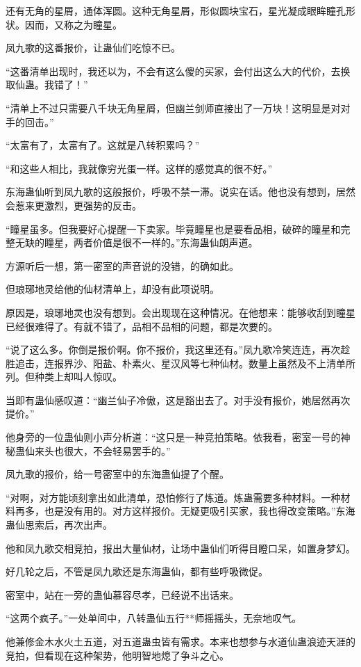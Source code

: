 \begin{this_body}
还有无角的星屑，通体浑圆。这种无角星屑，形似圆块宝石，星光凝成眼眸瞳孔形状。因而，又称之为瞳星。

凤九歌的这番报价，让蛊仙们吃惊不已。

“这番清单出现时，我还以为，不会有这么傻的买家，会付出这么大的代价，去换取仙蛊。我错了！”

“清单上不过只需要八千块无角星屑，但幽兰剑师直接出了一万块！这明显是对对手的回击。”

“太富有了，太富有了。这就是八转积累吗？”

“和这些人相比，我就像穷光蛋一样。这样的感觉真的很不好。”

东海蛊仙听到凤九歌的这般报价，呼吸不禁一滞。说实在话。他也没有想到，居然会惹来更激烈，更强势的反击。

“瞳星虽多。但我要好心提醒一下卖家。毕竟瞳星也是要看品相，破碎的瞳星和完整无缺的瞳星，两者价值是很不一样的。”东海蛊仙朗声道。

方源听后一想，第一密室的声音说的没错，的确如此。

但琅琊地灵给他的仙材清单上，却没有此项说明。

原因是，琅琊地灵也没有想到。会出现现在这种情况。在他想来：能够收刮到瞳星已经很难得了。有就不错了，品相不品相的问题，都是次要的。

“说了这么多。你倒是报价啊。你不报价，我这里还有。”凤九歌冷笑连连，再次趁胜追击，连报界沙、阳盐、朴素火、星汉风等七种仙材。数量上虽然及不上清单所列。但种类上却叫人惊叹。

当即有蛊仙感叹道：“幽兰仙子冷傲，这是豁出去了。对手没有报价，她居然再次提价。”

他身旁的一位蛊仙则小声分析道：“这只是一种竞拍策略。依我看，密室一号的神秘蛊仙来头也很大，不会轻易罢手的。”

凤九歌的报价，给一号密室中的东海蛊仙提了个醒。

“对啊，对方能顷刻拿出如此清单，恐怕修行了炼道。炼蛊需要多种材料。一种材料再多，也是没有用的。对方这样报价。无疑更吸引买家，我也得改变策略。”东海蛊仙思索后，再次出声。

他和凤九歌交相竞拍，报出大量仙材，让场中蛊仙们听得目瞪口呆，如置身梦幻。

好几轮之后，不管是凤九歌还是东海蛊仙，都有些呼吸微促。

密室中，站在一旁的蛊仙慕容尽孝，已经说不出话来。

“这两个疯子。”一处单间中，八转蛊仙五行**师摇摇头，无奈地叹气。

他兼修金木水火土五道，对五道蛊虫皆有需求。本来也想参与水道仙蛊浪迹天涯的竞拍，但看现在这种架势，他明智地熄了争斗之心。


\end{this_body}
